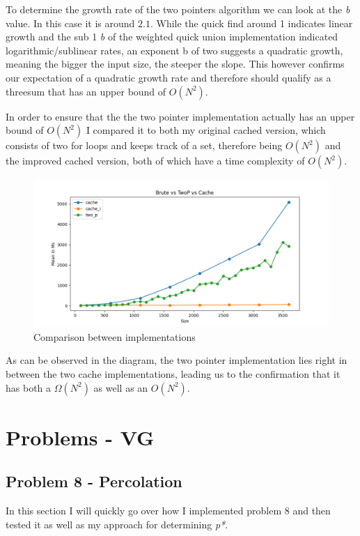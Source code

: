 \documentclass[12pt]{article}
\begin{document}
To determine the growth rate of the two pointers algorithm we can look at the \emph{b} value.
In this case it is around \emph{$2.1$}. While the quick find around 1 indicates linear growth and the 
sub 1 \emph{b} of the weighted quick union implementation indicated logarithmic/sublinear rates, an exponent b
of two suggests a quadratic growth, meaning the bigger the input size, the steeper the slope.
This however confirms our expectation of a quadratic growth rate and therefore should qualify
as a threesum that has an upper bound of $O(N^2)$.

In order to ensure that the the two pointer implementation actually has an upper bound of $O(N^2)$
I compared it to both my original cached version, which consists of two for loops and keeps track of a set, 
therefore being $O(N^2)$ and the improved cached version, both of which have a time complexity of $O(N^2)$.

\begin{figure}[h]
        \includegraphics[width=0.9\linewidth]{images/comparison.png}
        \caption{Comparison between implementations}
        \label{fig:image1}
\end{figure}

As can be observed in the diagram, the two pointer implementation lies right in between the two cache implementations,
leading us to the confirmation that it has both a $\Omega{(N^2)}$ as well as an $O{(N^2)}$.

\section{Problems - VG}

\subsection{Problem 8 - Percolation}

In this section I will quickly go over how I implemented problem 8 and then tested it as well
as my approach for determining \emph{p*}.
\end{document}
